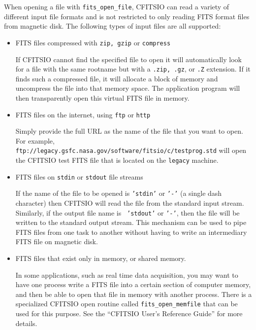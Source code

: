 \documentclass[11pt]{article}
\begin{document}
When opening a file with {\tt fits\_open\_file}, CFITSIO can read a
variety of different input file formats and is not restricted to only
reading FITS format files from magnetic disk. The following types of
input files are all supported:

\begin{itemize}
\item FITS files compressed with {\tt zip, gzip} or {\tt compress}

If CFITSIO cannot find the specified file to open it will automatically
look for a file with the same rootname but with a {\tt .zip, .gz}, or
{\tt .Z} extension.  If it finds such a compressed file, it will
allocate a block of memory and uncompress the file into that memory
space.  The application program will then transparently open this
virtual FITS file in memory.

\item  FITS files on the internet, using {\tt ftp} or {\tt http}

Simply provide the full URL as the name of the file that you want to open.  For example,\linebreak
{\tt ftp://legacy.gsfc.nasa.gov/software/fitsio/c/testprog.std}\linebreak
will open the CFITSIO test FITS file that is located on the {\tt legacy} machine.

\item  FITS files on {\tt stdin} or {\tt stdout} file streams

If the name of the file to be opened is {\tt 'stdin'} or {\tt '-'} (a
single dash character) then CFITSIO will read the file from the
standard input stream.  Similarly, if the output file name is {\tt
'stdout'} or {\tt '-'}, then the file will be written to the standard
output stream.  This mechanism can be used to pipe FITS files from one task
to another without having to write an intermediary FITS file on magnetic disk.

\item FITS files that exist only in memory, or shared memory.

In some applications, such as real time data acquisition, you may want
to have one process write a FITS file into a certain section of
computer memory, and then be able to open that file in memory with
another process.  There is a specialized CFITSIO open routine called
{\tt fits\_open\_memfile} that can be used for this purpose.  See the
``CFITSIO User's Reference Guide'' for more details.


\end{itemize}
\end{document}
